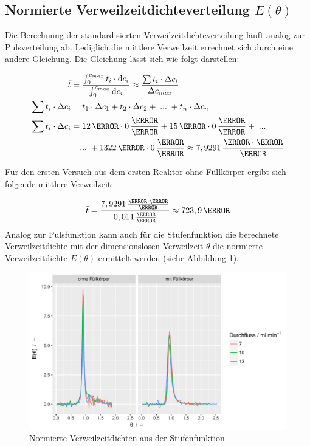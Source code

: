 \documentclass[12pt,liststotoc]{report}
\begin{document}
\subsection{Normierte Verweilzeitdichteverteilung $E(\theta)$}

Die Berechnung der standardisierten Verweilzeitdichteverteilung läuft analog zur Pulsverteilung ab. Lediglich die mittlere Verweilzeit errechnet sich durch eine andere Gleichung. Die Gleichung lässt sich wie folgt darstellen:

\begin{align}
\bar{t}=&\; \frac{\int_{0}^{c_{max}}t_i \cdot\text{d}c_i}{\int_{0}^{c_{max}}\text{d}c_i}\approx \frac{\sum t_i\cdot\Delta c_i}{\Delta c_{max}}\\
\sum t_i\cdot\Delta c_i =&\; t_1\cdot\Delta c_1 + t_2\cdot\Delta c_2+\;...\;+t_n\cdot\Delta c_n\\
\sum t_i\cdot\Delta c_i =&\; 12\,\s\cdot0\,\frac{\mole}{\litre}  + 15\,\s\cdot 0\,\frac{\mole}{\litre}+\;...\notag\\
&...\;+1322\,\s\cdot 0\,\frac{\mole}{\litre}\approx 7,9291\,\frac{\mole\cdot\s}{\litre} \notag
\end{align}

Für den ersten Versuch aus dem ersten Reaktor ohne Füllkörper ergibt sich folgende mittlere Verweilzeit:

\begin{equation}
\bar{t}= \frac{7,9291\,\frac{\mole\cdot\s}{\litre}}{0,011\,\frac{\mole}{\litre}} \approx 723,9\,\s\notag
\end{equation}
\noindent
Analog zur Pulsfunktion kann auch für die Stufenfunktion die berechnete Verweilzeitdichte mit der dimensionslosen Verweilzeit $\theta$ die normierte Verweilzeitdichte $E(\theta)$ ermittelt werden (siehe Abbildung \ref{dichte_step_norm}).


\begin{figure}[H]
\centering
\includegraphics[width=1\textwidth]{Graphics/E_theta_step.pdf}
\caption[Normierte Verweilzeitdichte Stufenfunktion]{Normierte Verweilzeitdichten aus der Stufenfunktion}
\label{dichte_step_norm}
\end{figure}
\noindent
\end{document}
